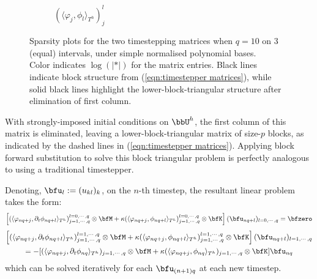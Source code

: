 \begin{example}
\begin{figure}[!ht]
\begin{subfigure}{0.5\textwidth}
                \caption{$(\langle\varphi_{j}, \phi_{l}\rangle_{T^{h}})_{j}^{l}$}
            \end{subfigure}
            \caption{Sparsity plots for the two timestepping matrices when $q = 10$ on 3 (equal) intervals, under simple normalised polynomial bases. \\ Color indicates $\log(|*|)$ for the matrix entries. Black lines indicate block structure from (\ref{eqn:timestepper matrices}), while solid black lines highlight the lower-block-triangular structure after elimination of first column.}
            \label{fig:timestepper matrices}
        \end{figure}

        With strongly-imposed initial conditions on $\bbU^{h}$, the first column of this matrix is eliminated, leaving a lower-block-triangular matrix of size-$p$ blocks, as indicated by the dashed lines in (\ref{eqn:timestepper matrices}). Applying block forward substitution to solve this block triangular problem is perfectly analogous to using a traditional timestepper.

        Denoting, $\bfu_{l}  :=  (u_{kl})_{k}$, on the $n$-th timestep, the resultant linear problem takes the form:
        \begin{equation}
            \left[(\langle\varphi_{nq + j}, \partial_{t}\phi_{nq + l}\rangle_{T^{h}})_{j = 1, \cdots, q}^{l = 0, \cdots, q}\otimes\bfM + \kappa(\langle\varphi_{nq + j}, \phi_{nq + l}\rangle_{T^{h}})_{j = 1, \cdots, q}^{l = 0, \cdots, q}\otimes\bfK\right](\bfu_{nq + l})_{l = 0, \cdots, q}  =  \bfzero
        \end{equation}
        \begin{multline}
            \left[(\langle\varphi_{nq + j}, \partial_{t}\phi_{nq + l}\rangle_{T^{h}})_{j = 1, \cdots, q}^{l = 1, \cdots, q}\otimes\bfM + \kappa(\langle\varphi_{nq + j}, \phi_{nq + l}\rangle_{T^{h}})_{j = 1, \cdots, q}^{l = 1, \cdots, q}\otimes\bfK\right](\bfu_{nq + l})_{l = 1, \cdots, q}  \\
            =  - [(\langle\varphi_{nq + j}, \partial_{t}\phi_{nq}\rangle_{T^{h}})_{j = 1, \cdots, q}\otimes\bfM + \kappa(\langle\varphi_{nq + j}, \phi_{nq}\rangle_{T^{h}})_{j = 1, \cdots, q}\otimes\bfK]\bfu_{nq}
        \end{multline}
        which can be solved iteratively for each $\bfu_{(n + 1)q}$ at each new timestep.


\end{example}
